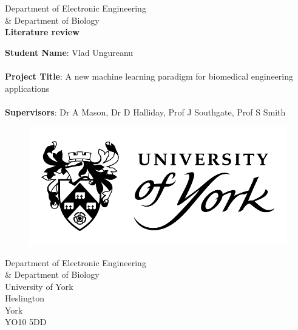 \begin{titlepage} 
  \begin{center} 
    
    	\large Department of Electronic Engineering \\ \& Department of Biology \\
        \vspace{1.5cm}
		\Huge \textbf{Literature review} \\
        \vspace{2.0cm}
            
       \begin{flushleft}
        \large \textbf{Student Name}: Vlad Ungureanu \\~\\
        \large \textbf{Project Title}: A new machine learning paradigm for
        biomedical engineering applications\\~\\
        \large \textbf{Supervisors}: Dr A Mason, Dr D Halliday, Prof J Southgate, Prof S Smith
 
       \end{flushleft} 
            
           \begin{figure}[t]
          	\includegraphics[width=\linewidth]{Images/Resources/UOY_logo}
          \end{figure}

    \vspace{2.6cm}
    \small Department of Electronic Engineering \\ \& Department of Biology \\
    \small University of York \\
    \small Heslington \\
    \small York \\
    \small YO10 5DD\\
                  
 \end{center} 
    
\end{titlepage}